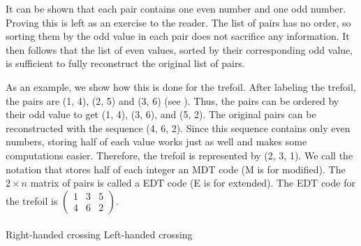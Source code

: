 \begin{paper}
It can be shown that each pair contains one even number and one odd number.
Proving this is left as an exercise to the reader.
The list of pairs has no order, so sorting them by the odd value in each pair
does not sacrifice any information.
It then follows that the list of even values, sorted by their corresponding odd
value, is sufficient to fully reconstruct the original list of pairs.\\

\begin{center}\end{center}


As an example, we show how this is done for the trefoil.
After labeling the trefoil, the pairs are (1, 4), (2, 5) and (3, 6) (see
\figLabeled).
Thus, the pairs can be ordered by their odd value to get (1, 4), (3, 6), and
(5, 2).
The original pairs can be reconstructed with the sequence (4, 6, 2).
Since this sequence contains only even numbers, storing half of each value works
just as well and makes some computations easier.
Therefore, the trefoil is represented by (2, 3, 1).
We call the notation that stores half of each integer an MDT code (M is for
modified).
The $2\times n$ matrix of pairs is called a EDT code (E is for extended).
The EDT code for the trefoil is $\begin{pmatrix}1&3&5\\4&6&2\end{pmatrix}$.\\

\hfill
{}\\

{\noindent\fontsize{9pt}{1em}\selectfont Right-handed crossing\hfill
Left-handed crossing}\\



\end{paper}
